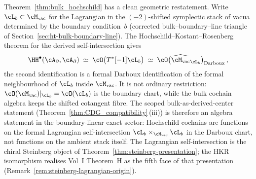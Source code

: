 \begin{remark}
\label{rem:lagrangian-self-intersection}
Theorem~\ref{thm:bulk_hochschild} has a clean geometric
restatement. Write $\cL_b \subset \cM_{\mathrm{vac}}$ for the
Lagrangian in the $(-2)$-shifted symplectic stack of vacua
determined by the boundary condition~$b$
(corrected bulk--boundary--line triangle of
Section~\ref{sec:ht-bulk-boundary-line}).
The Hochschild--Kostant--Rosenberg theorem for the derived
self-intersection gives
\[
 \HH^\bullet(\cA_\partial,\cA_\partial)
 \;\simeq\;
 \cO\bigl(T^*[-1]\cL_b\bigr)
 \;\simeq\;
 \cO\bigl(\widehat{\cM_{\mathrm{vac}}}_{\cL_b}\bigr)_{\mathrm{Darboux}}\,,
\]
the second identification is a formal Darboux identification of the
formal neighbourhood of $\cL_b$ inside $\cM_{\mathrm{vac}}$. It is not
ordinary restriction: $\cO(\cM_{\mathrm{vac}})|_{\cL_b}=\cO(\cL_b)$ is
the boundary chart, while the bulk cochain algebra keeps the shifted
cotangent fibre. The scoped bulk-as-derived-center statement
(Theorem~\ref{thm:CDG_compatibility}\,(iii)) is therefore an algebra
statement in the boundary-linear exact sector: Hochschild cochains are
functions on the formal Lagrangian self-intersection
$\cL_b \times_{\cM_{\mathrm{vac}}}\cL_b$ in the Darboux chart, not
functions on the ambient stack itself. The Lagrangian
self-intersection is the chiral Steinberg object of
Theorem~\ref{thm:steinberg-presentation}; the HKR isomorphism
realises Vol~I Theorem~H as the fifth face of that
presentation (Remark~\ref{rem:steinberg-lagrangian-origin}).
\end{remark}

